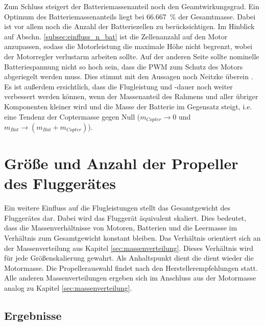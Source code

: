 Zum Schluss steigert der Batteriemassenanteil noch den Geamtwirkungsgrad. 
Ein Optimum des Batteriemassenanteils liegt bei \SI{66,667}{\%} der Gesamtmasse. Dabei ist vor allem noch die Anzahl der Batteriezellen zu berücksichtigen. Im Hinblick auf Abschn. \ref{subsec:einfluss_n_bat} ist die Zellenanzahl auf den Motor anzupassen, sodass die Motorleistung die maximale Höhe nicht begrenzt, wobei der Motorregler verlustarm arbeiten sollte. Auf der anderen Seite sollte nominelle Batteriespannung nicht so hoch sein, dass die PWM zum Schutz des Motors abgeriegelt werden muss. 
Dies stimmt mit den Aussagen noch Neitzke überein \cite{Neitzke.2013}.
Es ist außerdem ersichtlich, dass die Flugleistung und -dauer noch weiter verbessert werden können, wenn der Massenanteil des Rahmens und aller übriger Komponenten kleiner wird und die Masse der Batterie im Gegensatz steigt, i.e. eine Tendenz der Coptermasse gegen Null (\ensuremath{m_{Copter}\rightarrow 0} und \ensuremath{m_{Bat}\rightarrow (m_{Bat}+m_{Copter})}).



\section{Größe und Anzahl der Propeller des Fluggerätes}
\label{sec:groesse}
Ein weitere Einfluss auf die Flugleistungen stellt das Gesamtgewicht des Fluggerätes dar. Dabei wird das Fluggerät äquivalent skaliert. Dies bedeutet, dass die Massenverhältnisse von Motoren, Batterien und die Leermasse im Verhältnis zum Gesamtgewicht konstant bleiben. Das Verhältnis orientiert sich an der Massenverteilung aus Kapitel \ref{sec:massenverteilung}. Dieses Verhältnis wird für jede Größenskalierung gewahrt. Als Anhaltspunkt dient die dient wieder die Motormasse. Die Propellerauswahl findet nach den Herstellerempfehlungen statt. Alle anderen Massenverteilungen ergeben sich im Anschluss aus der Motormasse analog zu Kapitel \ref{sec:massenverteilung}.

\subsection{Ergebnisse}
\label{subsec:ergebnisse_groesse}

